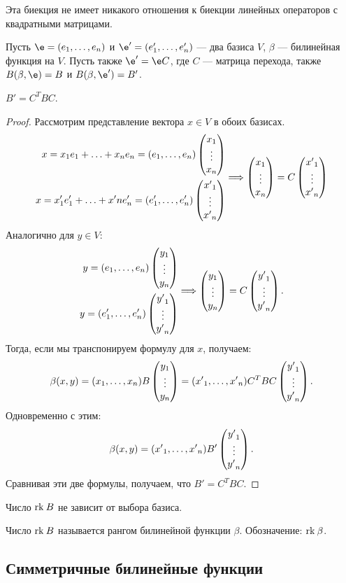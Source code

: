 \begin{Comment}
Эта биекция не имеет никакого отношения к биекции линейных операторов с квадратными матрицами.
\end{Comment}

Пусть $\e = (e_1, \ldots, e_n)$ и $\e' = (e'_1, \ldots, e'_n)$ --- два базиса $V$, $\beta$ --- билинейная функция на $V$. Пусть также $\e' = \e C$, где $C$ --- матрица перехода, также $B(\beta, \e) = B$ и $B(\beta, \e') = B'$.

\begin{Suggestion}
$B' = C^TBC$.
\end{Suggestion}

\begin{proof}
Рассмотрим представление вектора $x \in V$ в обоих базисах.
\begin{gather*}
\begin{aligned}
x = x_1e_1 + \ldots + x_ne_n = (e_1, \ldots, e_n)\begin{pmatrix}{x}_1 \\\vdots\\{x}_n\end{pmatrix} \\
x = x'_1e'_1 + \ldots + x'ne'_n = (e'_1, \ldots, e'_n) \begin{pmatrix}{x'}_1 \\\vdots\\{x'}_n\end{pmatrix}
\end{aligned}
\Longrightarrow
\begin{pmatrix}{x}_1 \\\vdots\\{x}_n\end{pmatrix} = C\begin{pmatrix}{x'}_1 \\\vdots\\{x'}_n\end{pmatrix}
\end{gather*}
Аналогично для $y \in V$:
\begin{gather*}
\begin{aligned}
y = (e_1, \ldots, e_n)\begin{pmatrix}{y}_1 \\\vdots\\{y}_n\end{pmatrix} \\
y = (e'_1, \ldots, e'_n) \begin{pmatrix}{y'}_1 \\\vdots\\{y'}_n\end{pmatrix}
\end{aligned}
\Longrightarrow
\begin{pmatrix}{y}_1 \\\vdots\\{y}_n\end{pmatrix} = C\begin{pmatrix}{y'}_1 \\\vdots\\{y'}_n\end{pmatrix}.
\end{gather*}
Тогда,  если мы транспонируем формулу для $x$, получаем:
$$
\beta(x, y) = ({x}_1, \ldots, {x}_n)B\begin{pmatrix}{y}_1 \\\vdots\\{y}_n\end{pmatrix} = ({x'}_1, \ldots, {x'}_n)C^TBC\begin{pmatrix}{y'}_1 \\\vdots\\{y'}_n\end{pmatrix}.
$$
Одновременно с этим:
$$
\beta(x, y) = ({x'}_1, \ldots, {x'}_n)B'\begin{pmatrix}{y'}_1 \\\vdots\\{y'}_n\end{pmatrix}.
$$
Сравнивая эти две формулы, получаем, что $B' = C^TBC$.
\end{proof}

\begin{Consequence}
Число $\mathrm{rk}\: B$ не зависит от выбора базиса.
\end{Consequence}

\begin{Def}
Число $\mathrm{rk}\: B$ называется рангом билинейной функции $\beta$. Обозначение: $\mathrm{rk}\: \beta$.
\end{Def}

\subsection*{Симметричные билинейные функции}

